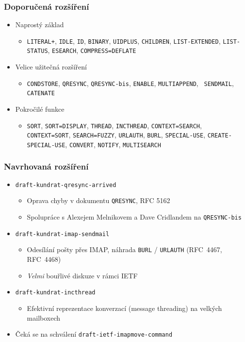\documentclass{beamer}
\begin{document}
\begin{frame}[fragile]
  \frametitle{Doporučená rozšíření}
  \begin{itemize}
    \item Naprostý základ
      \begin{itemize}
        \item {\tt LITERAL+}, {\tt IDLE}, {\tt ID}, {\tt BINARY}, {\tt UIDPLUS}, {\tt CHILDREN}, {\tt LIST-EXTENDED},
          {\tt LIST-STATUS}, {\tt ESEARCH}, {\tt COMPRESS=DEFLATE}
      \end{itemize}
    \item Velice užitečná rozšíření
      \begin{itemize}
        \item {\tt CONDSTORE}, {\tt QRESYNC}, {\tt \alert<2->{QRESYNC-bis}}, {\tt ENABLE}, {\tt MULTIAPPEND}, {\tt
          \alert<2->{SENDMAIL}}, {\tt CATENATE}
      \end{itemize}
    \item Pokročilé funkce
      \begin{itemize}
        \item {\tt SORT}, {\tt SORT=DISPLAY}, {\tt THREAD}, {\tt \alert<2->{INCTHREAD}}, {\tt CONTEXT=SEARCH}, {\tt
          CONTEXT=SORT}, {\tt SEARCH=FUZZY}, {\tt URLAUTH}, {\tt BURL}, {\tt SPECIAL-USE}, {\tt CREATE-SPECIAL-USE},
          {\tt CONVERT}, {\tt NOTIFY}, {\tt MULTISEARCH}
      \end{itemize}
  \end{itemize}
\end{frame}

\begin{frame}[fragile]
  \frametitle{Navrhovaná rozšíření}
  \begin{itemize}
    \item {\tt draft-kundrat-qresync-arrived}
      \begin{itemize}
        \item Oprava chyby v dokumentu {\tt QRESYNC}, RFC 5162
        \item Spolupráce s Alexejem Melnikovem a Dave Cridlandem na {\tt QRESYNC-bis}
      \end{itemize}
    \item {\tt draft-kundrat-imap-sendmail}
      \begin{itemize}
        \item Odesílání pošty přes IMAP, náhrada {\tt BURL} / {\tt URLAUTH} (RFC~4467, RFC~4468)
        \item {\em Velmi} bouřlivé diskuze v rámci IETF
      \end{itemize}
    \item {\tt draft-kundrat-incthread}
      \begin{itemize}
        \item Efektivní reprezentace konverzací (message threading) na velkých mailboxech
      \end{itemize}
    \item Čeká se na schválení {\tt draft-ietf-imapmove-command}
  \end{itemize}
\end{frame}
\end{document}
